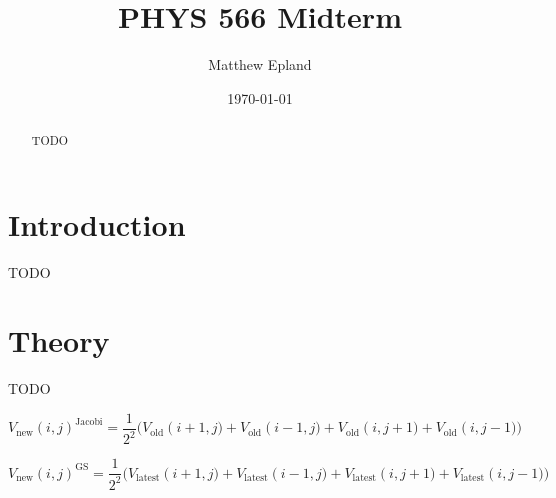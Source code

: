 \documentclass[notitlepage,aps,prd,nofootinbib]{revtex4-1}
\begin{document}
\title{PHYS 566 Midterm}
\author{Matthew Epland}

\date{\today}

\begin{abstract}
TODO
\end{abstract}\maketitle


\section{Introduction}
\label{sec:intro}
TODO

\section{Theory}
\label{sec:theory}
TODO


\begin{equation} \label{eq:jacobi}
V_{\mathrm{new}}\left(i,j\right)^{\mathrm{Jacobi}} = \frac{1}{2^2}\big( V_{\mathrm{old}}\left(i+1,j) + V_{\mathrm{old}}\left(i-1,j) +V_{\mathrm{old}}\left(i,j+1) +V_{\mathrm{old}}\left(i,j-1) \big)
\end{equation}

\begin{equation} \label{eq:GS}
V_{\mathrm{new}}\left(i,j\right)^{\mathrm{GS}} = \frac{1}{2^2}\big( V_{\mathrm{latest}}\left(i+1,j) + V_{\mathrm{latest}}\left(i-1,j) +V_{\mathrm{latest}}\left(i,j+1) +V_{\mathrm{latest}}\left(i,j-1) \big)
\end{equation}
\end{document}
